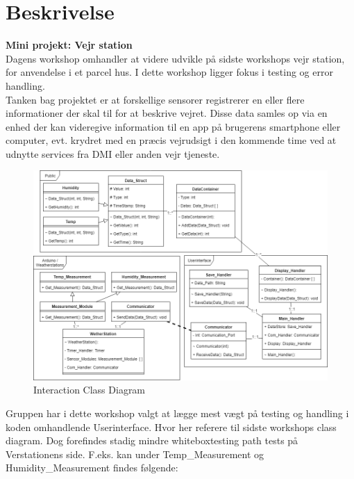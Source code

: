 \documentclass[11pt]{article}
\renewcommand{\baselinestretch}{1.20}
\begin{document}
    
    
    
    \renewcommand{\baselinestretch}{0.8}
    \tableofcontents
    \renewcommand{\baselinestretch}{1.20}
    \newpage
    
    \section{Beskrivelse}
    \textbf{Mini projekt: Vejr station}\\
    Dagens workshop omhandler at videre udvikle på sidste workshops vejr station, for anvendelse i et parcel hus. I dette workshop ligger fokus i testing og error handling.\\
    Tanken bag projektet er at forskellige sensorer registrerer en eller flere informationer der skal til for at beskrive vejret. Disse data samles op via en enhed der kan videregive information til en app på brugerens smartphone eller computer, evt. krydret med en præcis vejrudsigt i den kommende time ved at udnytte services fra DMI
    eller anden vejr tjeneste.
    
    \begin{figure}[H]
        \centering
        \includegraphics[width=1\textwidth, angle =0]{Struktureret_System_Udvikling/Workshop_2/Assets/Workshop2_ClassDiagram.png}
        \caption{Interaction Class Diagram}
        \label{fig:my_label}
    \end{figure}
    \noindent
    Gruppen har i dette workshop valgt at lægge mest vægt på testing og handling i koden omhandlende Userinterface. Hvor her referere til sidste workshops class diagram.
    Dog forefindes stadig mindre whiteboxtesting path tests på Verstationens side. F.eks. kan under Temp\_Measurement og Humidity\_Measurement findes følgende:
    
\end{document}
